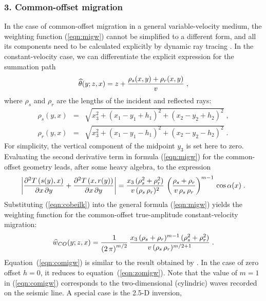 \subsubsection{3. Common-offset migration}
In the case of common-offset migration in a general variable-velocity
medium, the weighting function (\ref{eqn:migw}) cannot be simplified to a
different form, and all its components need to be calculated
explicitly by dynamic ray tracing \cite[]{castro}.  In the
constant-velocity case, we can differentiate the explicit expression
for the summation path
\begin{equation}
\widehat{\theta}(y;z,x)  =  z + 
{{\rho_s(x,y) + \rho_r(x,y)} \over v}\;,
\end{equation}
where $\rho_s$ and
$\rho_r$ are the lengths of the incident and reflected rays:
\begin{eqnarray}
\rho_s(y,x) & = & 
\sqrt{x_3^2 + (x_1 - y_1 + h_1)^2 + (x_2 - y_2 + h_2)^2}\;,
 \\
\rho_r(y,x) & = & 
\sqrt{x_3^2 + (x_1 - y_1 - h_1)^ 2+ (x_2 - y_2 - h_2)^2}\;.
\end{eqnarray}
For simplicity, the vertical component of the midpoint $y_3$ is set here to zero. Evaluating the second derivative term in formula
(\ref{eqn:migw}) for the common-offset geometry leads, after some heavy
algebra, to the expression 
\begin{equation}
\left|{{\partial^2 T\left(s(y),x\right)} 
\over {\partial x\,\partial y}} +     
      {{\partial^2 T\left(x,r(y)\right)}
\over {\partial x\,\partial y}}\right| = 
{{x_3\,(\rho_s^2 + \rho_r^2)} \over {v\,(\rho_s\,\rho_r)^2}}\,
\left({{\rho_s + \rho_r} \over {v\,\rho_s\,\rho_r}}\right)^{m-1}
\,\cos{\alpha(x)}\;.
\label{eqn:cobeilk}
\end{equation}
Substituting (\ref{eqn:cobeilk}) into the general formula (\ref{eqn:migw}) yields
the weighting function for the common-offset true-amplitude
constant-velocity migration:
\begin{equation}
\widehat{w}_{CO}(y;z,x)  =  {1\over{\left(2\,\pi\right)^{m/2}}} \,
{{x_3\,(\rho_s + \rho_r)^{m-1}\,(\rho_s^2 + \rho_r^2)} \over 
{v\,(\rho_s\,\rho_r)^{m/2+1}}}\;.
\label{eqn:comigw}
\end{equation}
Equation~(\ref{eqn:comigw}) is similar to the result obtained by
\cite{GEO52.06.07450754}. In the case of zero offset $h=0$,
it reduces to equation~(\ref{eqn:zomigw}). Note that the value
of $m=1$ in (\ref{eqn:comigw}) corresponds to the two-dimensional (cylindric)
waves recorded on the seismic line. A special case is the 2.5-D inversion,
